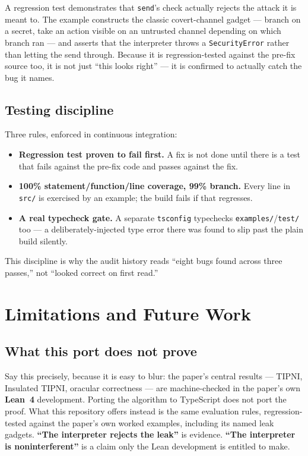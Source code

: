 \documentclass[11pt, a4paper]{article}
\begin{document}
A regression test demonstrates that \lstinline{send}'s check actually
rejects the attack it is meant to. The example constructs the classic
covert-channel gadget --- branch on a secret, take an action visible on an
untrusted channel depending on which branch ran --- and asserts that the
interpreter throws a \lstinline{SecurityError} rather than letting the
send through. Because it is regression-tested against the pre-fix source
too, it is not just ``this looks right'' --- it is confirmed to actually
catch the bug it names.

\subsection{Testing discipline}

Three rules, enforced in continuous integration:

\begin{itemize}
  \item \textbf{Regression test proven to fail first.} A fix is not done
    until there is a test that fails against the pre-fix code and passes
    against the fix.
  \item \textbf{100\% statement/function/line coverage, 99\% branch.}
    Every line in \texttt{src/} is exercised by an example; the build
    fails if that regresses.
  \item \textbf{A real typecheck gate.} A separate \texttt{tsconfig}
    typechecks \texttt{examples/}/\texttt{test/} too --- a
    deliberately-injected type error there was found to slip past the
    plain build silently.
\end{itemize}

This discipline is why the audit history reads ``eight bugs found across
three passes,'' not ``looked correct on first read.''

\section{Limitations and Future Work}
\label{sec:limits}

\subsection{What this port does not prove}

Say this precisely, because it is easy to blur: the paper's central
results --- TIPNI, Insulated TIPNI, oracular correctness --- are
machine-checked in the paper's own \textbf{Lean~4} development. Porting
the algorithm to TypeScript does not port the proof. What this repository
offers instead is the same evaluation rules, regression-tested against
the paper's own worked examples, including its named leak gadgets.
\textbf{``The interpreter rejects the leak''} is evidence.
\textbf{``The interpreter is noninterferent''} is a claim only the Lean
development is entitled to make.
\end{document}
